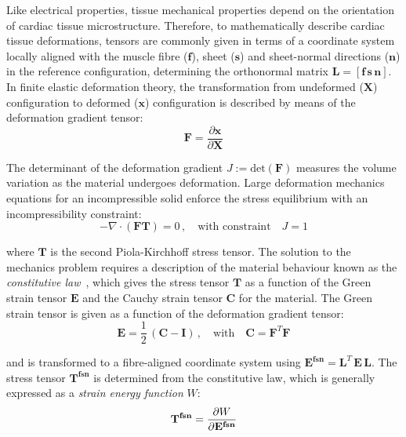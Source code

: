 \vspace{0.2cm}
Like electrical properties, tissue mechanical properties depend on the orientation of cardiac tissue microstructure. Therefore, to mathematically describe cardiac tissue deformations, tensors are commonly given in terms of a coordinate system locally aligned with the muscle fibre ($\mathbf{f}$), sheet ($\mathbf{s}$) and sheet-normal directions ($\mathbf{n}$) in the reference configuration, determining the orthonormal matrix $\mathbf{L} = [\mathbf{f}\,\mathbf{s}\,\mathbf{n}]$. In finite elastic deformation theory, the transformation from undeformed ($\mathbf{X}$) configuration to deformed ($\mathbf{x}$) configuration is described by means of the deformation gradient tensor:
%
\begin{equation}
    \mathbf{F} = \frac{\partial \mathbf{x}}{\partial\mathbf{X}}
\end{equation}

\noindent
The determinant of the deformation gradient $J:=\text{det}(\mathbf{F})$ measures the volume variation as the material undergoes deformation. Large deformation mechanics equations for an incompressible solid enforce the stress equilibrium with an incompressibility constraint:
%
\begin{equation}
    -\nabla\cdot(\mathbf{F}\mathbf{T}) = 0\,,\quad\text{with constraint}\quad J = 1
\end{equation}

\noindent
where $\mathbf{T}$ is the second Piola-Kirchhoff stress tensor. The solution to the mechanics problem requires a description of the material behaviour known as the \textit{constitutive law}~\cite{BonetWood:2008}, which gives the stress tensor $\mathbf{T}$ as a function of the Green strain tensor $\mathbf{E}$ and the Cauchy strain tensor $\mathbf{C}$ for the material. The Green strain tensor is given as a function of the deformation gradient tensor:
%
\begin{equation}
    \mathbf{E} = \frac{1}{2}\,(\mathbf{C}-\mathbf{I})\,,\quad\text{with}\quad \mathbf{C}=\mathbf{F}^T\mathbf{F}
\end{equation}

\noindent
and is transformed to a fibre-aligned coordinate system using $\mathbf{E^{fsn}}=\mathbf{L}^T\,\mathbf{E}\,\mathbf{L}$. The stress tensor $\mathbf{T^{fsn}}$ is determined from the constitutive law, which is generally expressed as a \textit{strain energy function} $W$:
%
\begin{equation}
    \mathbf{T^{fsn}} = \dfrac{\partial {W}}{\partial {\mathbf{E^{fsn}}}}
\end{equation}

